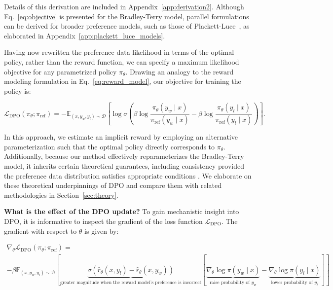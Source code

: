 Details of this derivation are included in Appendix~\ref{app:derivation2}. Although Eq.~\ref{eq:objective} is presented for the Bradley-Terry model, parallel formulations can be derived for broader preference models, such as those of Plackett-Luce~\citep{plackett1975analysis, luce2012individual}, as elaborated in Appendix~\ref{app:plackett_luce_models}.

Having now rewritten the preference data likelihood in terms of the optimal policy, rather than the reward function, we can specify a maximum likelihood objective for any parametrized policy $\pi_\theta$. Drawing an analogy to the reward modeling formulation in Eq.~\ref{eq:reward_model}, our objective for training the policy is:

\begin{equation}\label{eq:optimum_model}
    \mathcal{L}_\text{DPO}(\pi_{\theta}; \pi_\text{ref}) = -\mathbb{E}_{(x, y_w, y_l)\sim \mathcal{D}}\left[\log \sigma \left(\beta \log \frac{\pi_{\theta}(y_w\mid x)}{\pi_\text{ref}(y_w\mid x)} - \beta \log \frac{\pi_{\theta}(y_l\mid x)}{\pi_\text{ref}(y_l\mid x)}\right)\right].
\end{equation}

In this approach, we estimate an implicit reward by employing an alternative parameterization such that the optimal policy directly corresponds to $\pi_\theta$. Additionally, because our method effectively reparameterizes the Bradley-Terry model, it inherits certain theoretical guarantees, including consistency provided the preference data distribution satisfies appropriate conditions \cite{bong2022generalized}. We elaborate on these theoretical underpinnings of DPO and compare them with related methodologies in Section~\ref{sec:theory}.

\textbf{What is the effect of the DPO update?} To gain mechanistic insight into DPO, it is informative to inspect the gradient of the loss function $\mathcal{L}_\text{DPO}$. The gradient with respect to $\theta$ is given by:

\begin{multline*}\label{eq:gradient}
    \nabla_\theta \mathcal{L}_\text{DPO}(\pi_\theta;\pi_\text{ref}) = \\ -\beta\mathbb{E}_{(x, y_w, y_l) \sim \mathcal{D}} \left[\underbrace{\sigma(\hat{r}_\theta(x, y_l) - \hat{r}_\theta (x, y_w))}_\text{greater magnitude when the reward model's preference is incorrect}\left[\underbrace{\nabla_\theta\log \pi(y_w \mid x)}_\text{raise probability of $y_w$} - \underbrace{\nabla_\theta\log\pi(y_l \mid x)}_\text{lower probability of $y_l$}\right]\right],
\end{multline*}

